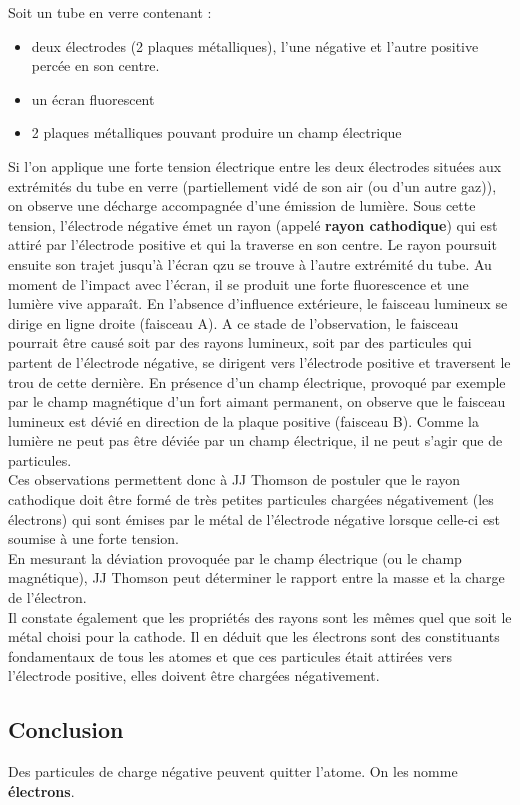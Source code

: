 \documentclass[../main.tex]{subfiles}
\begin{document}
Soit un tube en verre contenant :
\begin{itemize}
    \item deux électrodes (2 plaques métalliques), l'une négative et l'autre positive percée en son centre.
    \item un écran fluorescent
    \item 2 plaques métalliques pouvant produire un champ électrique
\end{itemize}
Si l'on applique une forte tension électrique entre les deux électrodes situées aux extrémités du tube en verre (partiellement vidé de son air (ou d'un autre gaz)), on observe une décharge accompagnée d'une émission de lumière. Sous cette tension, l'électrode négative émet un rayon (appelé \textbf{rayon cathodique}) qui est attiré par l'électrode positive et qui la traverse en son centre. Le rayon poursuit ensuite son trajet jusqu'à l'écran qzu se trouve à l'autre extrémité du tube. Au moment de l'impact avec l'écran, il se produit une forte fluorescence et une lumière vive apparaît. En l'absence d'influence extérieure, le faisceau lumineux se dirige en ligne droite (faisceau A). A ce stade de l'observation, le faisceau pourrait être causé soit par des rayons lumineux, soit par des particules qui partent de l'électrode négative, se dirigent vers l'électrode positive et traversent le trou de cette dernière. En présence d'un champ électrique, provoqué par exemple par le champ magnétique d'un fort aimant permanent, on observe que le  faisceau lumineux est dévié en direction de la plaque positive (faisceau B). Comme la lumière ne peut pas être déviée par un champ électrique, il ne peut s'agir que de particules.\\
Ces observations permettent donc à JJ Thomson de postuler que le rayon cathodique doit être formé de très petites particules chargées négativement (les électrons) qui sont émises par le métal de l'électrode négative lorsque celle-ci est soumise à une forte tension.\\
En mesurant la déviation provoquée par le champ électrique (ou le champ magnétique), JJ Thomson peut déterminer le rapport entre la masse et la charge de l'électron.\\
Il constate également que les propriétés des rayons sont les mêmes quel que soit le métal choisi pour la cathode. Il en déduit que les électrons sont des constituants fondamentaux de tous les atomes et que ces particules était attirées vers l'électrode positive, elles doivent être chargées négativement.
\subsection{Conclusion}
Des particules de charge négative peuvent quitter l'atome. On les nomme \textbf{électrons}.
\end{document}

